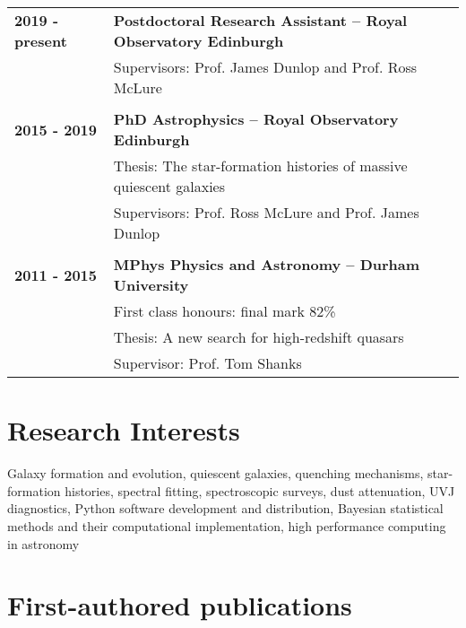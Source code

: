\documentclass[a4paper,fleqn,usenatbib,onecolumn]{mnras}
\title[Adam Carnall]{\center{Adam Carnall}}
\author[Adam Carnall]{Postdoctoral Research Assistant, Institute for Astronomy, Royal Observatory Edinburgh, EH9 3HJ
\\
}
\begin{document}
\maketitle



\large

\begingroup
\setlength{\tabcolsep}{0pt} %
\renewcommand{\arraystretch}{1.1} %
\begin{tabular}{ p{3cm} p{14cm} }
\\
\bf{2019 - present} & \bf{Postdoctoral Research Assistant -- Royal Observatory Edinburgh}\\
& Supervisors: Prof. James Dunlop and Prof. Ross McLure\\
\\
\bf{2015 - 2019} & \bf{PhD Astrophysics -- Royal Observatory Edinburgh}\\
& Thesis: The star-formation histories of massive quiescent galaxies \\
& Supervisors: Prof. Ross McLure and Prof. James Dunlop\\
\\
\bf{2011 - 2015} & \bf{MPhys Physics and Astronomy -- Durham University} \\          
& First class honours: final mark 82\% \\
& Thesis: A new search for high-redshift quasars\\
& Supervisor: Prof. Tom Shanks\\
\end{tabular}
\endgroup

\section*{Research Interests}

\noindent Galaxy formation and evolution, quiescent galaxies, quenching mechanisms, star-formation histories, spectral fitting, spectroscopic surveys, dust attenuation, UVJ diagnostics, Python software development and distribution, Bayesian statistical methods and their computational implementation, high performance computing in astronomy


\section*{First-authored publications}

\end{document}
